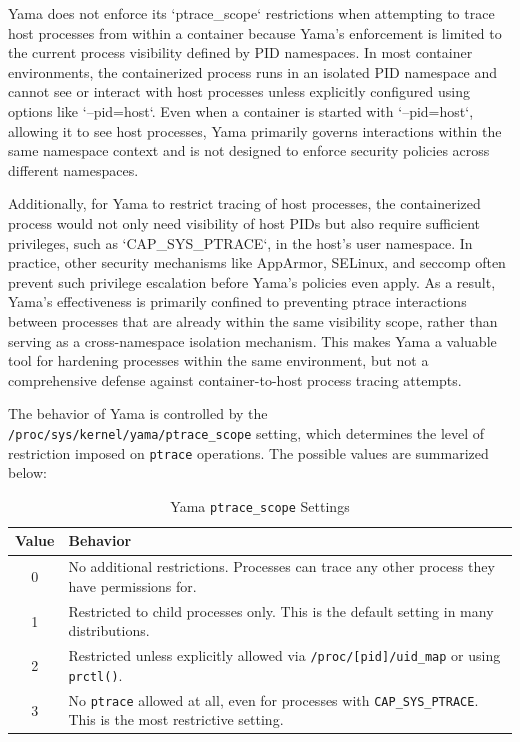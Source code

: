 \begin{doublespace}
Yama does not enforce its `ptrace\_scope` restrictions when attempting to trace host processes from within a container because Yama’s enforcement is limited to the current process visibility defined by PID namespaces. In most container environments, the containerized process runs in an isolated PID namespace and cannot see or interact with host processes unless explicitly configured using options like `--pid=host`. Even when a container is started with `--pid=host`, allowing it to see host processes, Yama primarily governs interactions within the same namespace context and is not designed to enforce security policies across different namespaces.

Additionally, for Yama to restrict tracing of host processes, the containerized process would not only need visibility of host PIDs but also require sufficient privileges, such as `CAP\_SYS\_PTRACE`, in the host’s user namespace. In practice, other security mechanisms like AppArmor, SELinux, and seccomp often prevent such privilege escalation before Yama’s policies even apply. As a result, Yama’s effectiveness is primarily confined to preventing ptrace interactions between processes that are already within the same visibility scope, rather than serving as a cross-namespace isolation mechanism. This makes Yama a valuable tool for hardening processes within the same environment, but not a comprehensive defense against container-to-host process tracing attempts.


The behavior of Yama is controlled by the \texttt{/proc/sys/kernel/yama/ptrace\_scope} setting, which determines the level of restriction imposed on \texttt{ptrace} operations. The possible values are summarized below:

\begin{table}[h]
    \centering
    \caption{Yama \texttt{ptrace\_scope} Settings}
    \label{tab:yama-settings}
    \begin{tabular}{|c|p{10cm}|}
        \hline
        \textbf{Value} & \textbf{Behavior} \\
        \hline
        0 & No additional restrictions. Processes can trace any other process they have permissions for. \\
        \hline
        1 & Restricted to child processes only. This is the default setting in many distributions. \\
        \hline
        2 & Restricted unless explicitly allowed via \texttt{/proc/[pid]/uid\_map} or using \texttt{prctl()}. \\
        \hline
        3 & No \texttt{ptrace} allowed at all, even for processes with \texttt{CAP\_SYS\_PTRACE}. This is the most restrictive setting. \\
        \hline
    \end{tabular}
\end{table}


\end{doublespace}
